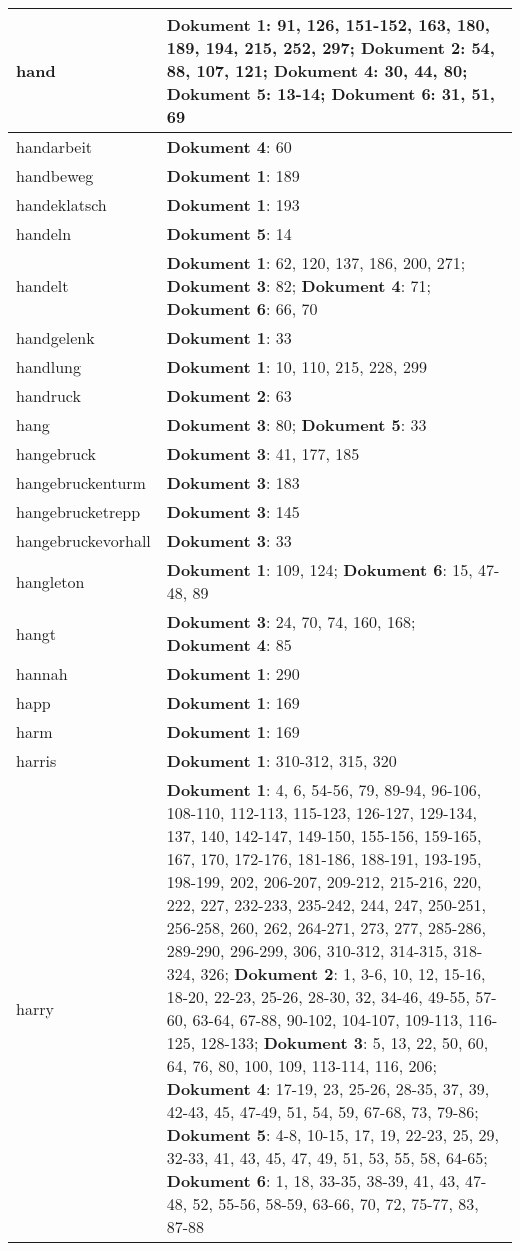 \documentclass[a5paper]{article}
\begin{document}
\begin{longtable}[l]{|l|p{3in}|}
\hline
hand & \textbf{Dokument 1}: 91, 126, 151-152, 163, 180, 189, 194, 215, 252, 297; \textbf{Dokument 2}: 54, 88, 107, 121; \textbf{Dokument 4}: 30, 44, 80; \textbf{Dokument 5}: 13-14; \textbf{Dokument 6}: 31, 51, 69 \\
\hline
handarbeit & \textbf{Dokument 4}: 60 \\
\hline
handbeweg & \textbf{Dokument 1}: 189 \\
\hline
handeklatsch & \textbf{Dokument 1}: 193 \\
\hline
handeln & \textbf{Dokument 5}: 14 \\
\hline
handelt & \textbf{Dokument 1}: 62, 120, 137, 186, 200, 271; \textbf{Dokument 3}: 82; \textbf{Dokument 4}: 71; \textbf{Dokument 6}: 66, 70 \\
\hline
handgelenk & \textbf{Dokument 1}: 33 \\
\hline
handlung & \textbf{Dokument 1}: 10, 110, 215, 228, 299 \\
\hline
handruck & \textbf{Dokument 2}: 63 \\
\hline
hang & \textbf{Dokument 3}: 80; \textbf{Dokument 5}: 33 \\
\hline
hangebruck & \textbf{Dokument 3}: 41, 177, 185 \\
\hline
hangebruckenturm & \textbf{Dokument 3}: 183 \\
\hline
hangebrucketrepp & \textbf{Dokument 3}: 145 \\
\hline
hangebruckevorhall & \textbf{Dokument 3}: 33 \\
\hline
hangleton & \textbf{Dokument 1}: 109, 124; \textbf{Dokument 6}: 15, 47-48, 89 \\
\hline
hangt & \textbf{Dokument 3}: 24, 70, 74, 160, 168; \textbf{Dokument 4}: 85 \\
\hline
hannah & \textbf{Dokument 1}: 290 \\
\hline
happ & \textbf{Dokument 1}: 169 \\
\hline
harm & \textbf{Dokument 1}: 169 \\
\hline
harris & \textbf{Dokument 1}: 310-312, 315, 320 \\
\hline
harry & \textbf{Dokument 1}: 4, 6, 54-56, 79, 89-94, 96-106, 108-110, 112-113, 115-123, 126-127, 129-134, 137, 140, 142-147, 149-150, 155-156, 159-165, 167, 170, 172-176, 181-186, 188-191, 193-195, 198-199, 202, 206-207, 209-212, 215-216, 220, 222, 227, 232-233, 235-242, 244, 247, 250-251, 256-258, 260, 262, 264-271, 273, 277, 285-286, 289-290, 296-299, 306, 310-312, 314-315, 318-324, 326; \textbf{Dokument 2}: 1, 3-6, 10, 12, 15-16, 18-20, 22-23, 25-26, 28-30, 32, 34-46, 49-55, 57-60, 63-64, 67-88, 90-102, 104-107, 109-113, 116-125, 128-133; \textbf{Dokument 3}: 5, 13, 22, 50, 60, 64, 76, 80, 100, 109, 113-114, 116, 206; \textbf{Dokument 4}: 17-19, 23, 25-26, 28-35, 37, 39, 42-43, 45, 47-49, 51, 54, 59, 67-68, 73, 79-86; \textbf{Dokument 5}: 4-8, 10-15, 17, 19, 22-23, 25, 29, 32-33, 41, 43, 45, 47, 49, 51, 53, 55, 58, 64-65; \textbf{Dokument 6}: 1, 18, 33-35, 38-39, 41, 43, 47-48, 52, 55-56, 58-59, 63-66, 70, 72, 75-77, 83, 87-88 \\

\end{longtable}
\end{document}
